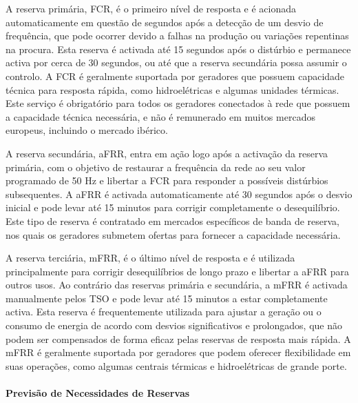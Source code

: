 A reserva primária, \gls{FCR}, é o primeiro nível de resposta e é acionada automaticamente em questão de segundos após a detecção de um desvio de frequência, que pode ocorrer devido a falhas na produção ou variações repentinas na procura. Esta reserva é activada até 15 segundos após o distúrbio e permanece activa por cerca de 30 segundos, ou até que a reserva secundária possa assumir o controlo. A \gls{FCR} é geralmente suportada por geradores que possuem capacidade técnica para resposta rápida, como hidroelétricas e algumas unidades térmicas. Este serviço é obrigatório para todos os geradores conectados à rede que possuem a capacidade técnica necessária, e não é remunerado em muitos mercados europeus, incluindo o mercado ibérico.\par
A reserva secundária, \gls{aFRR}, entra em ação logo após a activação da reserva primária, com o objetivo de restaurar a frequência da rede ao seu valor programado de 50 Hz e libertar a \gls{FCR} para responder a possíveis distúrbios subsequentes. A \gls{aFRR} é activada automaticamente até 30 segundos após o desvio inicial e pode levar até 15 minutos para corrigir completamente o desequilíbrio. Este tipo de reserva é contratado em mercados específicos de banda de reserva, nos quais os geradores submetem ofertas para fornecer a capacidade necessária.\par
A reserva terciária, \gls{mFRR}, é o último nível de resposta e é utilizada principalmente para corrigir desequilíbrios de longo prazo e libertar a \gls{aFRR} para outros usos. Ao contrário das reservas primária e secundária, a \gls{mFRR} é activada manualmente pelos \gls{TSO} e pode levar até 15 minutos a estar completamente activa. Esta reserva é frequentemente utilizada para ajustar a geração ou o consumo de energia de acordo com desvios significativos e prolongados, que não podem ser compensados de forma eficaz pelas reservas de resposta mais rápida. A \gls{mFRR} é geralmente suportada por geradores que podem oferecer flexibilidade em suas operações, como algumas centrais térmicas e hidroelétricas de grande porte.\par

\paragraph{Previsão de Necessidades de Reservas \label{se:pred_impact_vres}}
\text{ }  \par

